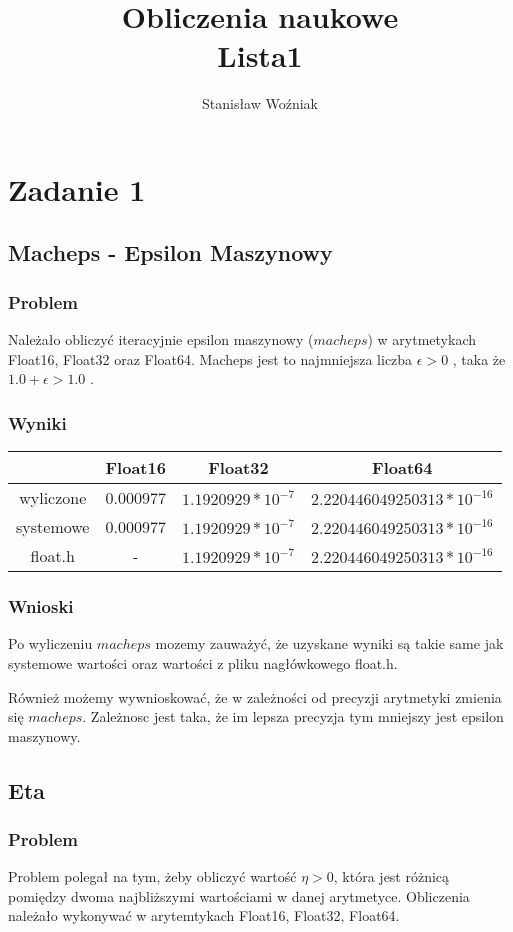 \documentclass[12pt, a4paper]{article}
\title{Obliczenia naukowe\\Lista1}
\author{Stanisław Woźniak}
\date{}
\begin{document}
\maketitle


\section{Zadanie 1}
\subsection{Macheps - Epsilon Maszynowy}
\subsubsection{Problem}
Należało obliczyć iteracyjnie epsilon maszynowy ($macheps$) w arytmetykach Float16, Float32 oraz Float64. Macheps jest to najmniejsza liczba $\epsilon > 0$ , taka że $1.0 + \epsilon > 1.0$ .
\subsubsection{Wyniki}
\begin{center}
\begin{tabular}{ c|c|c|c}
  & Float16 & Float32 & Float64\\
  \hline
 wyliczone & 0.000977 & $1.1920929 * 10^{-7}$ & $2.220446049250313 * 10^{-16}$\\
 systemowe & 0.000977 & $1.1920929 * 10^{-7}$ & $2.220446049250313 * 10^{-16}$\\
 float.h & - & $1.1920929 * 10^{-7}$ & $2.220446049250313 * 10^{-16}$
\end{tabular}
\end{center}
\subsubsection{Wnioski}
Po wyliczeniu $macheps$ mozemy zauważyć, że uzyskane wyniki są takie same jak systemowe wartości oraz wartości z pliku nagłówkowego float.h.

Również możemy wywnioskować, że w zależności od precyzji arytmetyki zmienia się $macheps$. Zależnosc jest taka, że im lepsza precyzja tym mniejszy jest epsilon maszynowy.
\subsection{Eta}
\subsubsection{Problem}
Problem polegał na tym, żeby obliczyć wartość $\eta > 0$, która jest różnicą pomiędzy dwoma najbliższymi wartościami w danej arytmetyce. Obliczenia należało wykonywać w arytemtykach Float16, Float32, Float64.
\end{document}

